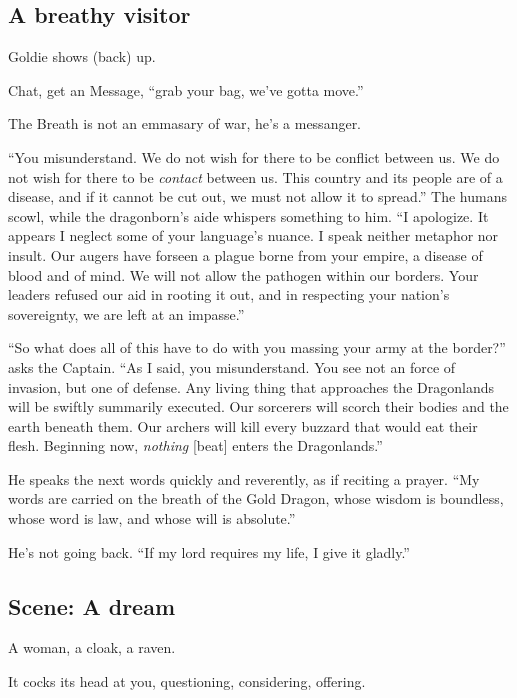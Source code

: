\begin{multicols}{2}
\subsection{A breathy visitor}
Goldie shows (back) up.

Chat, get an Message, ``grab your bag, we've gotta move.''

The Breath is not an emmasary of war, he's a messanger.

  \begin{aloud}
  ``You misunderstand.
    We do not wish for there to be conflict between us.
    We do not wish for there to be \emph{contact} between us.
    This country and its people are of a disease,
      and if it cannot be cut out, we must not allow it to spread.''
    The humans scowl, while the dragonborn's aide whispers something to him.
  ``I apologize.
    It appears I neglect some of your language's nuance.
    I speak neither metaphor nor insult.
    Our augers have forseen a plague borne from your empire, a disease of blood and of mind.
    We will not allow the pathogen within our borders.
    Your leaders refused our aid in rooting it out, and in respecting your nation's sovereignty,
      we are left at an impasse.''

  ``So what does all of this have to do with you massing your army at the border?''
     asks the Captain.
  ``As I said, you misunderstand.
    You see not an force of invasion, but one of defense.
    Any living thing that approaches the Dragonlands will be swiftly summarily executed.
    Our sorcerers will scorch their bodies and the earth beneath them.
    Our archers will kill every buzzard that would eat their flesh.
    Beginning now, \emph{nothing} [beat] enters the Dragonlands.''

    He speaks the next words quickly and reverently, as if reciting a prayer.
  ``My words are carried on the breath of the Gold Dragon,
      whose wisdom is boundless, whose word is law, and whose will is absolute.''
  \end{aloud}

  He's not going back.
  ``If my lord requires my life, I give it gladly.''



\subsection{Scene: A dream}

A woman, a cloak, a raven.

It cocks its head at you, questioning, considering, offering.


\end{multicols}
